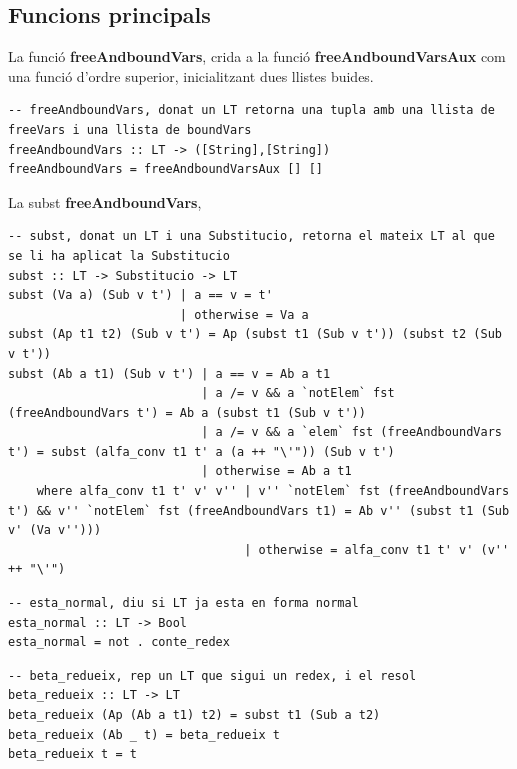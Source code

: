 \documentclass[10pt,a4paper]{article}
\begin{document}
\clearpage

\subsection{Funcions principals}

La funció \textbf{freeAndboundVars}, crida a la funció \textbf{freeAndboundVarsAux} com una funció d'ordre superior, inicialitzant dues llistes buides.

\lstset{language=Haskell, breaklines=true, basicstyle=\footnotesize}
\begin{lstlisting}[frame=mystyle]
-- freeAndboundVars, donat un LT retorna una tupla amb una llista de freeVars i una llista de boundVars
freeAndboundVars :: LT -> ([String],[String])
freeAndboundVars = freeAndboundVarsAux [] []
\end{lstlisting}

La subst \textbf{freeAndboundVars}, 

\lstset{language=Haskell, breaklines=true, basicstyle=\footnotesize}
\begin{lstlisting}[frame=mystyle]
-- subst, donat un LT i una Substitucio, retorna el mateix LT al que se li ha aplicat la Substitucio
subst :: LT -> Substitucio -> LT
subst (Va a) (Sub v t') | a == v = t'
                        | otherwise = Va a
subst (Ap t1 t2) (Sub v t') = Ap (subst t1 (Sub v t')) (subst t2 (Sub v t'))
subst (Ab a t1) (Sub v t') | a == v = Ab a t1
                           | a /= v && a `notElem` fst (freeAndboundVars t') = Ab a (subst t1 (Sub v t'))
                           | a /= v && a `elem` fst (freeAndboundVars t') = subst (alfa_conv t1 t' a (a ++ "\'")) (Sub v t')
                           | otherwise = Ab a t1
    where alfa_conv t1 t' v' v'' | v'' `notElem` fst (freeAndboundVars t') && v'' `notElem` fst (freeAndboundVars t1) = Ab v'' (subst t1 (Sub v' (Va v'')))
                                 | otherwise = alfa_conv t1 t' v' (v'' ++ "\'")
\end{lstlisting}



\lstset{language=Haskell, breaklines=true, basicstyle=\footnotesize}
\begin{lstlisting}[frame=mystyle]
-- esta_normal, diu si LT ja esta en forma normal
esta_normal :: LT -> Bool
esta_normal = not . conte_redex
\end{lstlisting}



\lstset{language=Haskell, breaklines=true, basicstyle=\footnotesize}
\begin{lstlisting}[frame=mystyle]
-- beta_redueix, rep un LT que sigui un redex, i el resol
beta_redueix :: LT -> LT
beta_redueix (Ap (Ab a t1) t2) = subst t1 (Sub a t2)
beta_redueix (Ab _ t) = beta_redueix t
beta_redueix t = t
\end{lstlisting}
\end{document}
